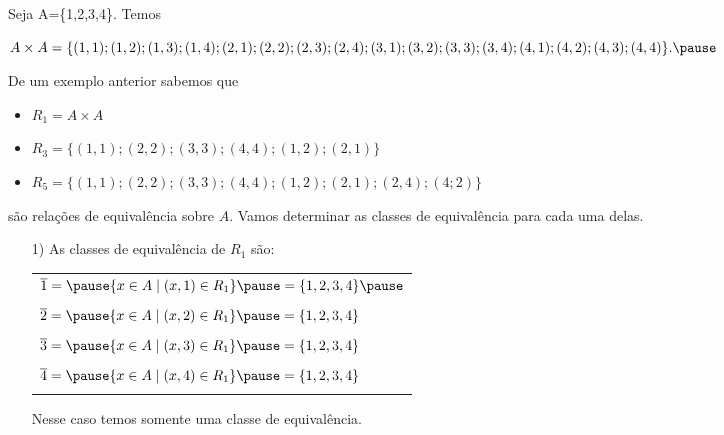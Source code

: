 \documentclass{beamer}
\begin{document}
    \begin{frame}
        \begin{exemplos}
            Seja A=\{1,2,3,4\}. \pause Temos
            \begin{center}
                $A\times A = \{(1,1);(1,2);(1,3);(1,4);(2,1);(2,2);(2,3);\linebreak (2,4);(3,1);(3,2);(3,3);(3,4);(4,1);(4,2);(4,3);(4,4)\}.\pause$
            \end{center}
            De um exemplo anterior sabemos que
            \begin{itemize}
                \item $R_{1}= A\times A$\pause \vspace{.3cm}
                \item $R_{3}=\{(1,1);(2,2);(3,3);(4,4);(1,2);(2,1)\}$\pause \vspace{.3cm}
                \item $R_{5}=\{(1,1);(2,2);(3,3);(4,4);(1,2);(2,1);(2,4);(4;2)\}$\pause \vspace{.3cm}
            \end{itemize}
            são relações de equivalência sobre $A$. \pause Vamos determinar as classes de equivalência para cada uma delas.\pause
        \end{exemplos}
    \end{frame}
    \begin{frame}
        \begin{exemplos}
            \begin{enumerate}
                \item[1)] As classes de equival\^encia de $R_1$ s\~ao:\pause
                \begin{center}
                    \begin{tabular}{l}
                        $\overline{1} = \pause \{x \in A \mid (x,1) \in R_1\} \pause = \{1,2,3,4\}\pause$\\ \\
                        $\overline{2} = \pause \{x \in A \mid (x,2) \in R_1\} \pause = \{1,2,3,4\}$\pause \\ \\
                        $\overline{3} = \pause \{x \in A \mid (x,3) \in R_1\} \pause = \{1,2,3,4\}$\pause \\ \\
                        $\overline{4} = \pause \{x \in A \mid (x,4) \in R_1\} \pause = \{1,2,3,4\}$\pause \\ \\
                    \end{tabular}
                \end{center}
                Nesse caso temos somente uma classe de equival\^encia.
            \end{enumerate}
        \end{exemplos}
    \end{frame}
\end{document}

